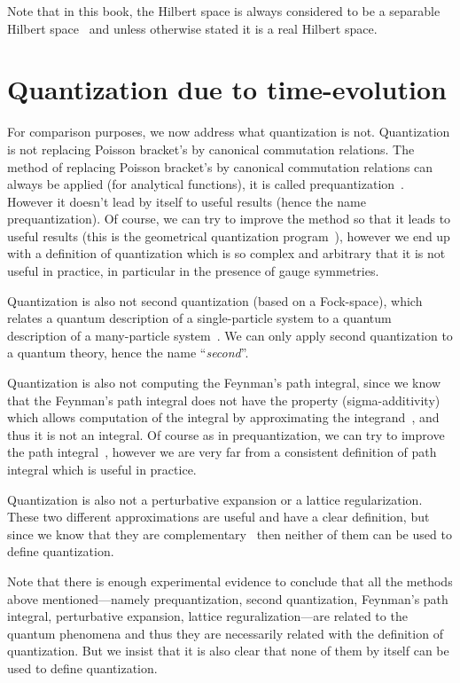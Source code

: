 \documentclass[11pt]{book}
\begin{document}
Note that in this book, the Hilbert space is always considered to be a
separable Hilbert space~\cite{Streater1989PCT} and unless otherwise stated it is a real
Hilbert space.

\hypertarget{quantization-due-to-time-evolution}{%
\section{Quantization due to
time-evolution}\label{quantization-due-to-time-evolution}}

For comparison purposes, we now address what quantization is not.
Quantization is not replacing Poisson bracket's by canonical commutation
relations. The method of replacing Poisson bracket's by canonical
commutation relations can always be applied (for analytical functions),
it is called
prequantization~\cite{Hall2013Quantum}\cite{Baez2006Categories}. However
it doesn't lead by itself to useful results (hence the name
prequantization). Of course, we can try to improve the method so that it
leads to useful results (this is the geometrical quantization
program~\cite{Hall2013Quantum}), however
we end up with a definition of quantization which is so complex and
arbitrary that it is not useful in practice, in particular in the
presence of gauge symmetries.

Quantization is also not second quantization (based on a Fock-space),
which relates a quantum description of a single-particle system to a
quantum description of a many-particle
system~\cite{Baez2006Categories}. We can
only apply second quantization to a quantum theory, hence the name
``\emph{second}''.

Quantization is also not computing the Feynman's path integral, since we
know that the Feynman's path integral does not have the property
(sigma-additivity) which allows computation of the integral by
approximating the
integrand~\cite{Strocchi2013introduction}, and thus it is not an integral. Of course as in prequantization,
we can try to improve the path
integral~\cite{Mazzucchi2009Mathematical}, however we are very far from a consistent definition of path
integral which is useful in practice.

Quantization is also not a perturbative expansion or a lattice
regularization. These two different approximations are useful and have a
clear definition, but since we know that they are
complementary~\cite{Strocchi2013introduction} then neither of them can be used to define quantization.

Note that there is enough experimental evidence to conclude that all the
methods above mentioned---namely prequantization, second quantization,
Feynman's path integral, perturbative expansion, lattice
reguralization---are related to the quantum phenomena and thus they are
necessarily related with the definition of quantization. But we insist
that it is also clear that none of them by itself can be used to define
quantization.
\end{document}
